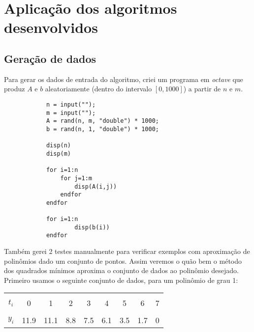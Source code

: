 \documentclass[a4paper,11pt]{article}
\begin{document}
\section{Aplicação dos algoritmos desenvolvidos}
    \subsection{Geração de dados}
        Para gerar os dados de entrada do algoritmo, criei um programa em \textit{octave} que produz $A$ e $b$ aleatoriamente (dentro do intervalo $[0,1000]$) a partir de $n$ e $m$. 
        \begin{lstlisting}
            n = input("");
            m = input("");
            A = rand(n, m, "double") * 1000;
            b = rand(n, 1, "double") * 1000;
            
            disp(n)
            disp(m)
            
            for i=1:n
                for j=1:m
                    disp(A(i,j))
                endfor
            endfor
            
            for i=1:n
                    disp(b(i))
            endfor
        \end{lstlisting}
        
        Também gerei 2 testes manualmente para verificar exemplos com aproximação de polinômios dado um conjunto de pontos. Assim veremos o quão bem o método dos quadrados mínimos aproxima o conjunto de dados ao polinômio desejado. Primeiro usamos o seguinte conjunto de dados, para um polinômio de grau 1:
        \begin{center}
            \begin{tabular}{ | c || c | c | c | c | c | c | c | c | } 
                \hline
                & & & & & & & & \\ [-1em]
                $t_i$ & 0 & 1 & 2 & 3 & 4 & 5 & 6 & 7 \\  [+.5em]
                \hline
                & & & & & & & & \\ [-1em]
                $y_i$ & 11.9 & 11.1 & 8.8 & 7.5 & 6.1 & 3.5 & 1.7 & 0 \\ [+.5em]
                \hline
            \end{tabular}
        \end{center}
        
\end{document}

